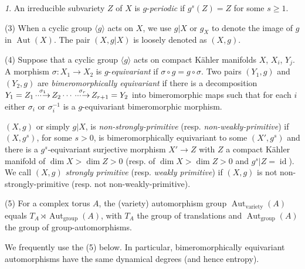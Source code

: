 \documentclass[11pt,a4paper,psamsfonts]{amsart}
\theoremstyle{plain}
\theoremstyle{definition}
\theoremstyle{remark}
\newtheorem{setup}[thm]{}
\begin{document}
\begin{setup}
An irreducible subvariety $Z$ of $X$ is $g$-{\it periodic} if $g^s(Z) = Z$ for some $s \ge 1$.

(3) When a cyclic group $\langle g \rangle$ acts on $X$,
we use $g|X$ or $g_X$ to denote the image of $g$ in ${\operatorname{Aut}}(X)$.
The pair $(X, g|X)$ is loosely denoted as $(X, g)$.

(4) Suppose that a cyclic group $\langle g \rangle$ acts on compact
K\"ahler manifolds $X$, $X_i$, $Y_j$.
A morphism $\sigma : X_1 \to X_2$ is $g$-{\it equivariant}
if $\sigma \circ g = g \circ \sigma$.
Two pairs $(Y_1, g)$ and $(Y_2, g)$ are {\it bimeromorphically equivariant}
if there is a decomposition $Y_1 = Z_1 \overset{\sigma_1}{{\,\cdot\negmedspace\cdot\negmedspace\cdot\negmedspace\to\,}} Z_2 \cdots
\overset{\sigma_r}{{\,\cdot\negmedspace\cdot\negmedspace\cdot\negmedspace\to\,}} Z_{r+1} = Y_2$ into bimeromorphic maps such that for each $i$ either
$\sigma_i$ or $\sigma_i^{-1}$ is a $g$-equivariant bimeromorphic morphism.

$(X, g)$ or simply $g|X$, is {\it non-strongly-primitive} (resp. {\it non-weakly-primitive})
if $(X, g^s)$, for some $s > 0$,
is bimeromorphically equivariant to some
$(X', g^s)$ and there is a $g^s$-equivariant surjective morphism $X' \to Z$
with $Z$ a compact K\"ahler manifold of $\dim X > \dim Z > 0$
(resp. of $\dim X > \dim Z > 0$ and $g^s|Z = {\operatorname{id}}$).
We call $(X, g)$ {\it strongly primitive} (resp. {\it weakly primitive})
if $(X, g)$ is not non-strongly-primitive (resp. not non-weakly-primitive).

(5) For a complex torus $A$, the (variety) automorphism group ${\operatorname{Aut}}_{\operatorname{variety}}(A)$ equals
$T_A \rtimes {\operatorname{Aut}}_{\operatorname{group}}(A)$,
with $T_A$ the group of translations and ${\operatorname{Aut}}_{\operatorname{group}}(A)$ the group
of group-automorphisms.
\end{setup}

We frequently use the (5) below.
In particular, bimeromorphically equivariant automorphisms have
the same dynamical degrees (and hence entropy).
\end{document}
